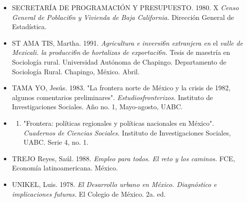 \documentclass{article}
\begin{document}
\begin{itemize}
\item 
SECRETARÍA DE PROGRAMACIÓN Y PRESUPUESTO. 1980. X \textit{Censo General de Poblaci6n y Vivienda de Baja California.} Dirección General de Estadística.

\item 
ST AMA TIS, Martha. 1991. \textit{Agricultura e inversi6n extranjera en} el \textit{valle de Mexicali. la producci6n} de \textit{hortalizas de exportaci6n.} Tesis de maestría en Sociología rural. Universidad Autónoma de Chapingo. Departamento de Sociología Rural. Chapingo, México. Abril.

\item 
TAMA YO, Jesús. 1983. "La frontera norte de México y la crisis de 1982, algunos comentarios preliminares". \textit{Estudiosfronterizos.} Instituto de Investigaciones Sociales. Año no. 1, Mayo-agosto, UABC.

\item \begin{enumerate}
\item 
"Frontera: políticas regionales y políticas nacionales en México". \textit{Cuadernos de Ciencias Sociales.} Instituto de Investigaciones Sociales, UABC. Serie 4, no. 1.

\end{enumerate}

\item 
TREJO Reyes, Saúl. 1988. \textit{Empleo para todos. El reto y los caminos.} FCE, Economía latinoamericana. México.

\item 
UNIKEL, Luis. 1978. \textit{El Desarrollo urbano en México. Diagnóstico e implicaciones futuras.} El Colegio de México. 2a. ed.

\end{itemize}
\end{document}
